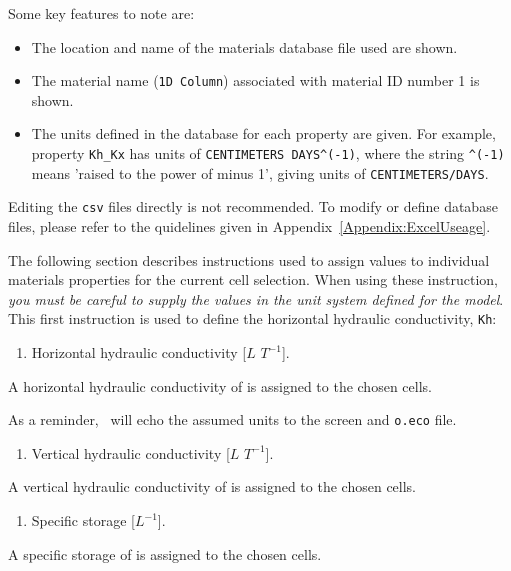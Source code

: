{\begin{verbatim}
\end{verbatim}
Some key features to note are:
\begin{itemize}
    \item The location and name of the materials database file used are shown.
    \item The material name (\texttt{1D Column}) associated with material ID number 1 is shown.
    \item The units defined in the database for each property are given. For example, property  \texttt{Kh\_Kx} has units of \verb+CENTIMETERS DAYS^(-1)+, where the string \verb+^(-1)+ means 'raised to the power of minus 1', giving units of \verb+CENTIMETERS/DAYS+.
\end{itemize}

Editing the \texttt{csv} files directly is not recommended. To modify or define database files, please refer to the quidelines given in Appendix~\ref{Appendix:ExcelUseage}.

The following section describes instructions used to assign values to individual materials properties for the current cell selection.  When using these instruction, {\em you must be careful to supply the values in the unit system defined for the model}. This first instruction is used to define the horizontal hydraulic conductivity, \texttt{Kh}:

    {
        \squish
        \begin{enumerate}
        \item {}  Horizontal hydraulic conductivity [$L$   $T^{-1}$].
        \end{enumerate}
          A horizontal hydraulic conductivity of  is assigned to the chosen cells.
    }

As a reminder, \mut\ will echo the assumed units to the screen and \texttt{o.eco} file.

    {
        \squish
        \begin{enumerate}
        \item {}  Vertical hydraulic conductivity [$L$   $T^{-1}$].
        \end{enumerate}
          A vertical hydraulic conductivity of  is assigned to the chosen cells.
    }

    {
        \squish
        \begin{enumerate}
        \item {}  Specific storage [$L^{-1}$].
        \end{enumerate}
          A specific storage of  is assigned to the chosen cells.
    }

}
